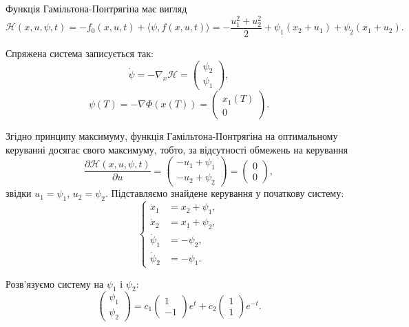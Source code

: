 \begin{solution}
    Функція Гамільтона-Понтрягіна має вигляд
    \begin{equation}
        \mathcal{H} (x, u, \psi, t) = - f_0(x, u, t) + \langle \psi, f(x, u, t) \rangle = - \dfrac{u_1^2 + u_2^2}{2} + \psi_1(x_2 + u_1) + \psi_2(x_1 + u_2).
    \end{equation}
    
    Спряжена система записується так:
    \begin{equation} 
        \dot \psi = - \nabla_x \mathcal{H} = \begin{pmatrix} \psi_2 \\ \psi_1 \end{pmatrix},
    \end{equation}
    \begin{equation} 
        \psi(T) = - \nabla \Phi(x(T)) = \begin{pmatrix} x_1(T) \\ 0 \end{pmatrix}.
    \end{equation}
    
    Згідно принципу максимуму, функція Гамільтона-Понтрягіна на оптимальному керуванні досягає свого максимуму, тобто, за відсутності обмежень на керування
    \begin{equation} 
        \dfrac{\partial \mathcal{H}(x, u, \psi, t)}{\partial u} = \begin{pmatrix} - u_1 + \psi_1 \\ -u_2 + \psi_2 \end{pmatrix} = \begin{pmatrix} 0 \\ 0 \end{pmatrix},
    \end{equation}
    звідки $u_1 = \psi_1$, $u_2 = \psi_2$. Підставляємо знайдене керування у початкову систему:
    \[ \left\{ \begin{aligned}
        \dot x_1 &= x_2 + \psi_1, \\
        \dot x_2 &= x_1 + \psi_2, \\
        \dot \psi_1 &= - \psi_2, \\
        \dot \psi_2 &= - \psi_1.
    \end{aligned} \right. \]
    
    Розв'язуємо систему на $\psi_1$ і $\psi_2$:
    \begin{equation}
        \begin{pmatrix} \psi_1 \\ \psi_2 \end{pmatrix} = c_1 \begin{pmatrix} 1 \\ -1 \end{pmatrix} e^t + c_2 \begin{pmatrix} 1 \\ 1 \end{pmatrix} e^{-t}.
    \end{equation}
    

\end{solution}
